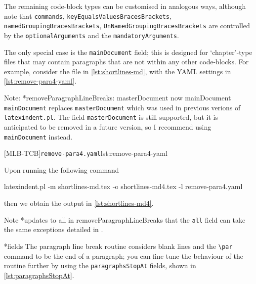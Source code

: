 	The remaining code-block types can be customised in analogous ways, although note that
	\texttt{commands}, \texttt{keyEqualsValuesBracesBrackets},
	\texttt{namedGroupingBracesBrackets}, \texttt{UnNamedGroupingBracesBrackets} are
	controlled by the \texttt{optionalArguments} and the \texttt{mandatoryArguments}.

	The only special case is the \texttt{mainDocument} field; this is designed for
	`chapter'-type files that may contain paragraphs that are not within any other
	code-blocks. For example, consider the file in \cref{lst:shortlines-md}, with the YAML
	settings in \cref{lst:remove-para4-yaml}.

	Note:
	*{removeParagraphLineBreaks: masterDocument now mainDocument}
	\texttt{mainDocument} replaces \texttt{masterDocument} which was used in previous verions
	of \texttt{latexindent.pl}. The field \texttt{masterDocument} is still supported, but it
	is anticipated to be removed in a future version, so I recommend using
	\texttt{mainDocument} instead.

	\begin{cmhtcbraster}
		[MLB-TCB]{\texttt{remove-para4.yaml}}{lst:remove-para4-yaml}
	\end{cmhtcbraster}

	Upon running the following command
	\begin{widepage}
		\begin{commandshell}
latexindent.pl -m shortlines-md.tex -o shortlines-md4.tex -l remove-para4.yaml
\end{commandshell}
	\end{widepage}
	then we obtain the output in \cref{lst:shortlines-md4}.

	Note%
	*{updates to all in removeParagraphLineBreaks} that the \texttt{all} field can take the same exceptions
	detailed in .

*{fields}
	The paragraph line break routine considers blank lines and the
	\lstinline|\par| command to be the end of a paragraph;
	 you can fine tune the behaviour of the routine
	further by using the \texttt{paragraphsStopAt} fields, shown in
	\cref{lst:paragraphsStopAt}.

